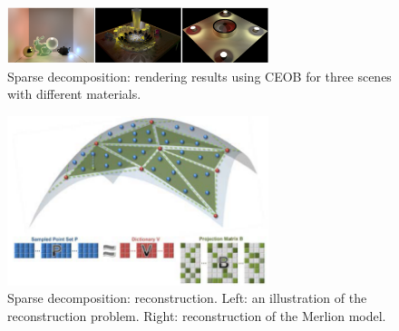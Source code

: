 \begin{figure}[ht]
  \centering
  \includegraphics[width=3in]{images/rendering_learning}
  \caption{Sparse decomposition: rendering\cite{miandji2013learning} results using CEOB for three scenes with different materials.}
\end{figure}

\begin{figure}[ht]
  \centering
  \includegraphics[width=3in]{images/reconstruction_learning}
  \caption{Sparse decomposition: reconstruction\cite{}. Left: an illustration of the reconstruction problem. Right: reconstruction of the Merlion model.}
\end{figure}
